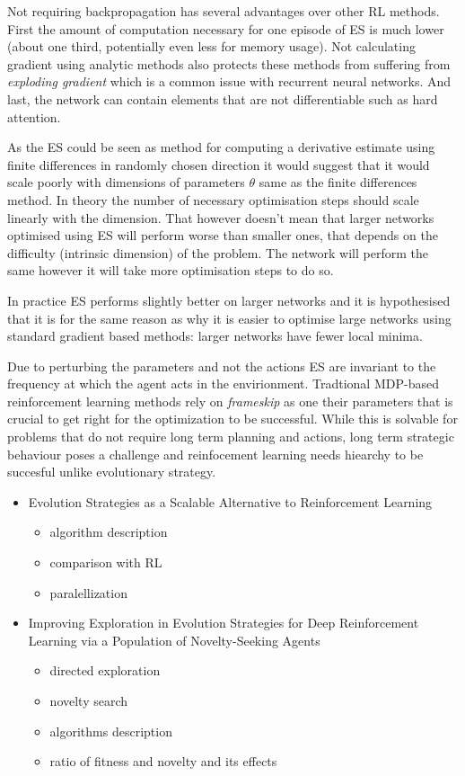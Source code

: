Not requiring backpropagation has several advantages over other RL methods. First the amount of computation necessary for one episode of ES is much lower (about one third, potentially even less for memory usage). Not calculating gradient using analytic methods also protects these methods from suffering from \emph{exploding gradient} which is a common issue with recurrent neural networks. And last, the network can contain elements that are not differentiable such as hard attention. 

As the ES could be seen as method for computing a derivative estimate using finite differences in randomly chosen direction it would suggest that it would scale poorly with dimensions of parameters $\theta$ same as the finite differences method. In theory the number of necessary optimisation steps should scale linearly with the dimension. That however doesn't mean that larger networks optimised using ES will perform worse than smaller ones, that depends on the difficulty (intrinsic dimension) of the problem. The network will perform the same however it will take more optimisation steps to do so. 

In practice ES performs slightly better on larger networks and it is hypothesised that it is for the same reason as why it is easier to optimise large networks using standard gradient based methods: larger networks have fewer local minima. 

Due to perturbing the parameters and not the actions ES are invariant to the frequency at which the agent acts in the envirionment. Tradtional MDP-based reinforcement learning methods rely on \emph{frameskip} as one their parameters that is crucial to get right for the optimization to be successful. While this is solvable for problems that do not require long term planning and actions, long term strategic behaviour poses a challenge and reinfocement learning needs hiearchy to be succesful unlike evolutionary strategy.
\begin{itemize}
    \item Evolution Strategies as a Scalable Alternative to Reinforcement Learning \cite{salimans2017} \begin{itemize}
        \item algorithm description
        \item comparison with RL
        \item paralellization
    \end{itemize}
    \item Improving Exploration in Evolution Strategies for Deep Reinforcement Learning via a Population of Novelty-Seeking Agents \cite{conti2018} \begin{itemize}
        \item directed exploration
        \item novelty search
        \item algorithms description
        \item ratio of fitness and novelty and its effects
        
    \end{itemize}
\end{itemize}